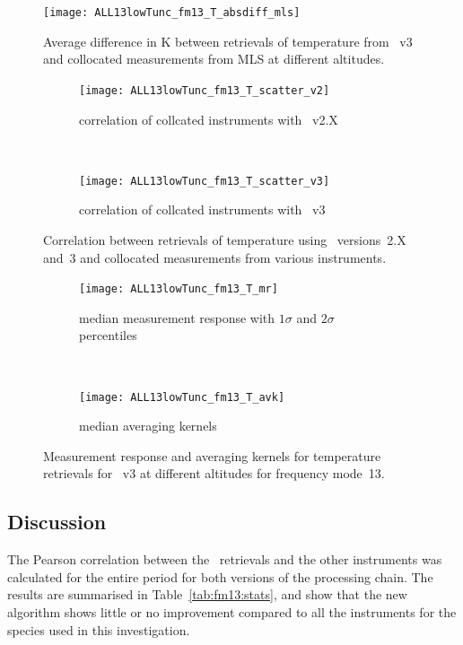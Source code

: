 \begin{figure}[tbhp]
    \centering
    \texttt{[image: ALL13lowTunc\_fm13\_T\_absdiff\_mls]}
    \caption{Average difference in K between retrievals of temperature from
    \smr~v3 and collocated measurements from MLS at different altitudes.}
    \label{fig:fm13:T:profiles}
        \label{fig:fm13:T:profiles:MLS}
\end{figure}

\begin{figure}[tbhp]
    \centering
    \begin{subfigure}[b]{0.49\textwidth}
        \texttt{[image: ALL13lowTunc\_fm13\_T\_scatter\_v2]}
        \caption{correlation of collcated instruments with \smr~v2.X}
        \label{fig:fm13:T:scatter:v2}
    \end{subfigure}
    \,
    \begin{subfigure}[b]{0.49\textwidth}
        \texttt{[image: ALL13lowTunc\_fm13\_T\_scatter\_v3]}
        \caption{correlation of collcated instruments with \smr~v3}
        \label{fig:fm13:T:scatter:v3}
    \end{subfigure}
    \caption{Correlation between retrievals of temperature using \smr\
    versions~2.X and~3 and collocated measurements from various instruments.}
    \label{fig:fm13:T:scatter}
\end{figure}

\begin{figure}[tbhp]
    \centering
    \begin{subfigure}[b]{0.49\textwidth}
        \texttt{[image: ALL13lowTunc\_fm13\_T\_mr]}
        \caption{median measurement response with $1\sigma$ and $2\sigma$
        percentiles}
        \label{fig:fm13:T:mr}
    \end{subfigure}
    \,
    \begin{subfigure}[b]{0.49\textwidth}
        \texttt{[image: ALL13lowTunc\_fm13\_T\_avk]}
        \caption{median averaging kernels\newline~}
        \label{fig:fm13:T:avk}
    \end{subfigure}
    \caption{Measurement response and averaging kernels for temperature
    retrievals for \smr~v3 at different altitudes for frequency mode~13.}
    \label{fig:fm13:T:mr_avk}
\end{figure}

\newpage
\subsection{Discussion}
\label{sec:fm13:discussion}
The Pearson correlation between the \smr\ retrievals and the other instruments
was calculated for the entire period for both versions of the processing chain.
The results are summarised in Table~\ref{tab:fm13:stats}, and show that the
new algorithm shows little or no improvement compared to all the instruments
for the species used in this investigation.


